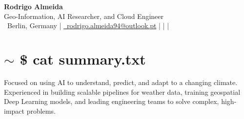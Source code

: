 \documentclass[a4paper,9pt]{article}
\begin{document}

\begin{center}
    {\Huge \textbf{Rodrigo Almeida}} \\ [2pt]
    {\large Geo-Information, AI Researcher, and Cloud Engineer} \\ [2pt]
    \small
    \faMapMarker* \ Berlin, Germany \quad | \quad
    \href{mailto:rodrigo.almeida94@outlook.pt}{\faEnvelope \ rodrigo.almeida94@outlook.pt} \quad | \quad
    \href{https://rodrigoalmeida.pt}{\faGlobe} \quad | \quad
    \href{https://github.com/rodrigoalmeida94}{\faGithub} \quad | \quad
    \href{https://www.linkedin.com/in/rodrigomalmeida/}{\faLinkedin}
\end{center}

\section*{\textcolor{promptcolor}{$\sim$} \textcolor{commandcolor}{\$ cat summary.txt}}
\noindent Focused on using AI to understand, predict, and adapt to a changing climate. Experienced in building scalable pipelines for weather data, training geospatial Deep Learning models, and leading engineering teams to solve complex, high-impact problems.
\end{document}
